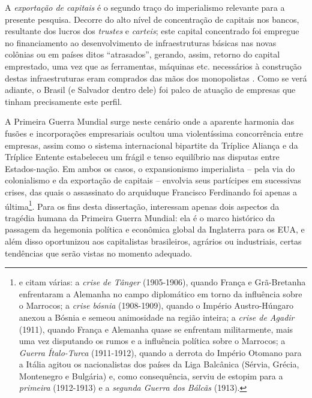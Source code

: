 A \textit{exportação de capitais} é o segundo traço do imperialismo relevante para a presente pesquisa. Decorre do alto nível de concentração de capitais nos bancos, resultante dos lucros dos \textit{trustes} e \textit{carteis}; este capital concentrado foi empregue no financiamento ao desenvolvimento de infraestruturas básicas nas novas colônias ou em países ditos ``atrasados'', gerando, assim, retorno do capital emprestado, uma vez que as ferramentas, máquinas etc. necessários à construção destas infraestruturas eram comprados das mãos dos monopolistas \cite{huberman_historia_1986,lenin_imperialismo_1987,luxemburg_acumula_1985}. Como se verá adiante, o Brasil (e Salvador dentro dele) foi palco de atuação de empresas que tinham precisamente este perfil.

A Primeira Guerra Mundial surge neste cenário onde a aparente harmonia das fusões e incorporações empresariais ocultou uma violentíssima concorrência entre empresas, assim como o sistema internacional bipartite da Tríplice Aliança e da Tríplice Entente estabeleceu um frágil e tenso equilíbrio nas disputas entre Estados-nação. Em ambos os casos, o expansionismo imperialista -- pela via do colonialismo e da exportação de capitais -- envolvia seus partícipes em sucessivas crises, das quais o assassinato do arquiduque Francisco Ferdinando foi apenas a última\footnote{ e  citam várias: a \textit{crise de Tânger} (1905-1906), quando França e Grã-Bretanha enfrentaram a Alemanha no campo diplomático em torno da influência sobre o Marrocos; a \textit{crise bósnia} (1908-1909), quando o Império Austro-Húngaro anexou a Bósnia e semeou animosidade na região inteira; a \textit{crise de Agadir} (1911), quando França e Alemanha quase se enfrentam militarmente, mais uma vez disputando os rumos e a influência política sobre o Marrocos; a \textit{Guerra Ítalo-Turca} (1911-1912), quando a derrota do Império Otomano para a Itália agitou os nacionalistas dos países da Liga Balcânica (Sérvia, Grécia, Montenegro e Bulgária) e, como consequência, serviu de estopim para a \textit{primeira} (1912-1913) e a \textit{segunda Guerra dos Bálcãs} (1913).}. Para os fins desta dissertação, interessam apenas dois aspectos da tragédia humana da Primeira Guerra Mundial: ela é o marco histórico da passagem da hegemonia política e econômica global da Inglaterra para os EUA, e além disso oportunizou aos capitalistas brasileiros, agrários ou industriais, certas tendências que serão vistas no momento adequado.

